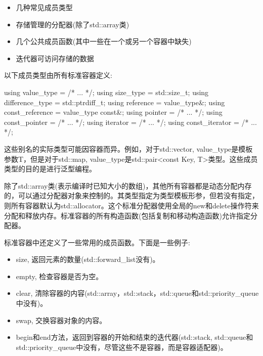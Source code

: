 \begin{itemize}
\item
几种常见成员类型

\item
存储管理的分配器(除了std::array类)

\item
几个公共成员函数(其中一些在一个或另一个容器中缺失)

\item
迭代器可访问存储的数据
\end{itemize}

以下成员类型由所有标准容器定义:

\begin{cpp}
using value_type = /* ... */;
using size_type = std::size_t;
using difference_type = std::ptrdiff_t;
using reference = value_type&;
using const_reference = value_type const&;
using pointer = /* ... */;
using const_pointer = /* ... */;
using iterator = /* ... */;
using const_iterator = /* ... */;
\end{cpp}

这些别名的实际类型可能因容器而异。例如，对于std::vector, value\_type是模板参数T，但是对于std::map, value\_type是std::pair<const Key, T>类型。这些成员类型的目的是进行泛型编程。

除了std::array类(表示编译时已知大小的数组)，其他所有容器都是动态分配内存的，可以通过分配器对象来控制的。其类型指定为类型模板形参，但若没有指定，则所有容器默认为std::allocator。这个标准分配器使用全局的new和delete操作符来分配和释放内存。标准容器的所有构造函数(包括复制和移动构造函数)允许指定分配器。

标准容器中还定义了一些常用的成员函数。下面是一些例子:

\begin{itemize}
\item
size, 返回元素的数量(std::forward\_list没有)。

\item
empty, 检查容器是否为空。

\item
clear, 清除容器的内容(std::array，std::stack，std::queue和std::priority\_queue中没有)。

\item
swap, 交换容器对象的内容。

\item
begin和end方法，返回到容器的开始和结束的迭代器(std::stack, std::queue和std::priority\_queue中没有，尽管这些不是容器，而是容器适配器)。
\end{itemize}

